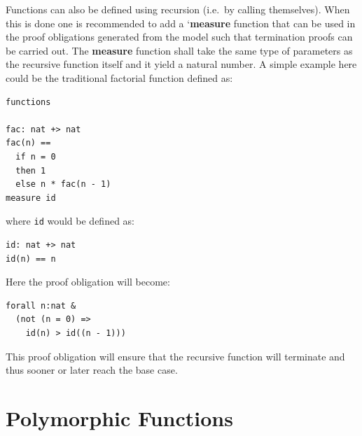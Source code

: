\documentclass{overturerepchap}
\newcommand{\Lop}[1]{`{\bf\ttfamily #1}\Quote}
\begin{document}
Functions can also be defined using recursion (i.e.\ by calling
themselves). When this is done one is recommended to add
a \Lop{measure} function that can be used in the proof obligations
generated from the model such that termination proofs can be carried
out. The {\bf\ttfamily measure} function shall take the same type of
parameters as the recursive function itself and it yield a natural
number. A simple example here could be the traditional factorial function
defined as:
\begin{lstlisting}
functions

fac: nat +> nat
fac(n) ==
  if n = 0
  then 1
  else n * fac(n - 1)
measure id
\end{lstlisting}
where \texttt{id} would be defined as:
\begin{lstlisting}
id: nat +> nat
id(n) == n
\end{lstlisting}
Here the proof obligation will become:
\begin{lstlisting}
forall n:nat &
  (not (n = 0) =>
    id(n) > id((n - 1)))
\end{lstlisting}
\noindent This proof obligation will ensure that the recursive
function will terminate and thus sooner or later reach the base case.

\section{Polymorphic Functions}
\end{document}
